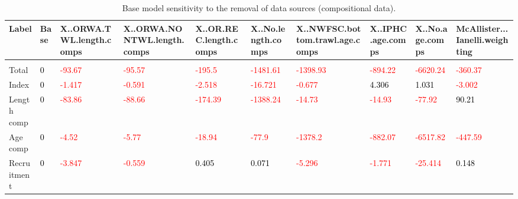 \documentclass[
]{scrartcl}
\begin{document}
\begin{landscape}
\begingroup\fontsize{9}{11}\selectfont

\begin{longtable}[t]{ll>{\raggedright\arraybackslash}p{4em}>{\raggedright\arraybackslash}p{4em}>{\raggedright\arraybackslash}p{4em}>{\raggedright\arraybackslash}p{4em}>{\raggedright\arraybackslash}p{4em}>{\raggedright\arraybackslash}p{4em}>{\raggedright\arraybackslash}p{4em}>{\raggedright\arraybackslash}p{4em}}

\caption{\label{tbl-sensitivities-like-comps}Base model sensitivity to
the removal of data sources (compositional data).}

\tabularnewline

\toprule
Label & Base & X..ORWA.TWL.length.comps & X..ORWA.NONTWL.length.comps & X..OR.REC.length.comps & X..No.length.comps & X..NWFSC.bottom.trawl.age.comps & X..IPHC.age.comps & X..No.age.comps & McAllister...Ianelli.weighting\\
\midrule
\addlinespace[0.3em]
\multicolumn{10}{l}{\textbf{Diff. in likelihood from base model}}\\
\hspace{1em}Total & \textcolor{black}{0} & \textcolor{red}{-93.67} & \textcolor{red}{-95.57} & \textcolor{red}{-195.5} & \textcolor{red}{-1481.61} & \textcolor{red}{-1398.93} & \textcolor{red}{-894.22} & \textcolor{red}{-6620.24} & \textcolor{red}{-360.37}\\
\hspace{1em}Index & \textcolor{black}{0} & \textcolor{red}{-1.417} & \textcolor{red}{-0.591} & \textcolor{red}{-2.518} & \textcolor{red}{-16.721} & \textcolor{red}{-0.677} & \textcolor{black}{4.306} & \textcolor{black}{1.031} & \textcolor{red}{-3.002}\\
\hspace{1em}Length comp & \textcolor{black}{0} & \textcolor{red}{-83.86} & \textcolor{red}{-88.66} & \textcolor{red}{-174.39} & \textcolor{red}{-1388.24} & \textcolor{red}{-14.73} & \textcolor{red}{-14.93} & \textcolor{red}{-77.92} & \textcolor{black}{90.21}\\
\hspace{1em}Age comp & \textcolor{black}{0} & \textcolor{red}{-4.52} & \textcolor{red}{-5.77} & \textcolor{red}{-18.94} & \textcolor{red}{-77.9} & \textcolor{red}{-1378.2} & \textcolor{red}{-882.07} & \textcolor{red}{-6517.82} & \textcolor{red}{-447.59}\\
\hspace{1em}Recruitment & \textcolor{black}{0} & \textcolor{red}{-3.847} & \textcolor{red}{-0.559} & \textcolor{black}{0.405} & \textcolor{black}{0.071} & \textcolor{red}{-5.296} & \textcolor{red}{-1.771} & \textcolor{red}{-25.414} & \textcolor{black}{0.148}\\

\end{longtable}
\end{landscape}
\end{document}
